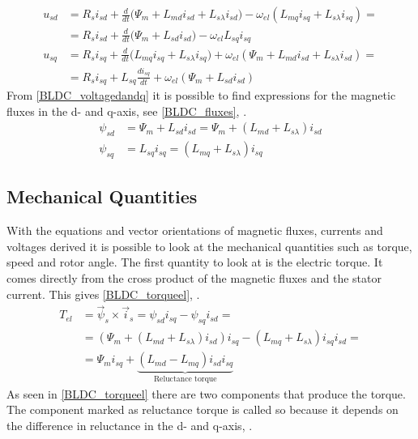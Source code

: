 \documentclass{LTHthesis}
\begin{document}
\begin{subequations} \label{BLDC_voltagedandq}
\begin{align}
\nonumber u_{sd}&=R_si_{sd}+\frac{d}{dt}\big(\Psi_m+L_{md}i_{sd}+L_{s\lambda}i_{sd}\big)-\omega_{el}(L_{mq}i_{sq}+L_{s\lambda}i_{sq})=\\&=R_si_{sd}+\frac{d}{dt}\big(\Psi_m+L_{sd}i_{sd}\big)-\omega_{el}L_{sq}i_{sq}\\
\nonumber u_{sq}&=R_si_{sq}+\frac{d}{dt}\big(L_{mq}i_{sq}+L_{s\lambda}i_{sq}\big)+\omega_{el}(\Psi_m+L_{md}i_{sd}+L_{s\lambda}i_{sd})=\\&=R_si_{sq}+L_{sq}\frac{di_{sq}}{dt}+\omega_{el}(\Psi_m+L_{sd}i_{sd})
\end{align}
\end{subequations}
From \eqref{BLDC_voltagedandq} it is possible to find expressions for the magnetic fluxes in the d- and q-axis, see \eqref{BLDC_fluxes}, \cite{ala_kar2014}.
\begin{subequations} \label{BLDC_fluxes}
\begin{align}
\psi_{sd}&=\Psi_m+L_{sd}i_{sd}=\Psi_m+(L_{md}+L_{s\lambda})i_{sd}\label{BLDC_fluxes1}\\
\psi_{sq}&=L_{sq}i_{sq}=(L_{mq}+L_{s\lambda})i_{sq}\label{BLDC_fluxes2}
\end{align}
\end{subequations}
\subsection{Mechanical Quantities}
With the equations and vector orientations of magnetic fluxes, currents and voltages derived it is possible to look at the mechanical quantities such as torque, speed and rotor angle.
The first quantity to look at is the electric torque. It comes directly from the cross product of the magnetic fluxes and the stator current. This gives \eqref{BLDC_torqueel}, \cite{ala_kar2014}.
\begin{align} \label{BLDC_torqueel}
T_{el}&=\vec{\psi}_s\times\vec{i}_s=\psi_{sd}i_{sq}-\psi_{sq}i_{sd}=\nonumber\\&=(\Psi_m+(L_{md}+L_{s\lambda})i_{sd})i_{sq}-(L_{mq}+L_{s\lambda})i_{sq}i_{sd}=\nonumber\\&=\Psi_mi_{sq}+\underbrace{(L_{md}-L_{mq})i_{sd}i_{sq}}_\text{Reluctance torque}
\end{align}
As seen in \eqref{BLDC_torqueel} there are two components that produce the torque. The component marked as reluctance torque is called so because it depends on the difference in reluctance in the d- and q-axis, \cite{ala_kar2014}.
\end{document}
